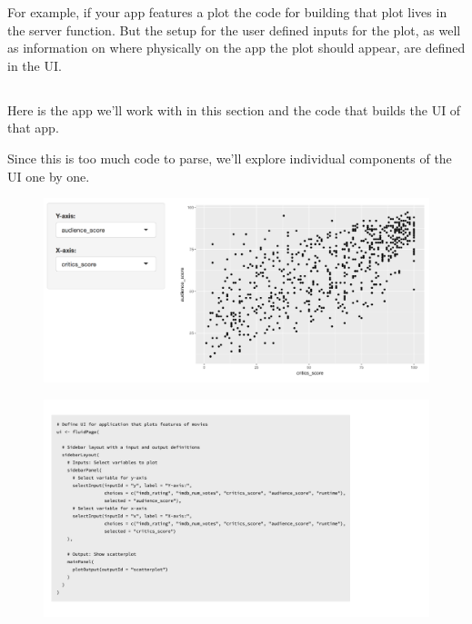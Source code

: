 \documentclass[
  letterpaper,
  DIV=11,
  numbers=noendperiod]{scrreprt}
\begin{document}
For example, if your app features a plot the code for building that plot
lives in the server function. But the setup for the user defined inputs
for the plot, as well as information on where physically on the app the
plot should appear, are defined in the UI.

\hypertarget{section-3}{%
\subsection{}\label{section-3}}

Here is the app we'll work with in this section and the code that builds
the UI of that app.

Since this is too much code to parse, we'll explore individual
components of the UI one by one.

\begin{figure}

{\centering \includegraphics[width=1\textwidth,height=\textheight]{./images/app-selectinput-scatterplot.png}

}

\end{figure}

\begin{figure}

{\centering \includegraphics[width=1\textwidth,height=\textheight]{./images/ui-selectinput-scatterplot.png}

}

\end{figure}
\end{document}
